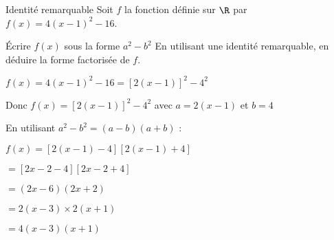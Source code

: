 \def\rdifficulty{1.5}
\begin{EXO}{Identité remarquable}{}
Soit $f$ la fonction définie sur $\R$ par $f(x)=4(x-1)^2-16$.
\begin{tcbenumerate}[2]
\tcbitem {} Écrire $f(x)$ sous la forme $a^2-b^2$
\tcbitem {} En utilisant une identité remarquable, en déduire la forme factorisée de $f$.
\end{tcbenumerate}

\exocorrection

\begin{tcbenumerate}[1]
\tcbitem $f(x) = 4(x-1)^2 - 16 = [2(x-1)]^2 - 4^2$

Donc $f(x) = [2(x-1)]^2 - 4^2$ avec $a = 2(x-1)$ et $b = 4$

\tcbitem En utilisant $a^2-b^2 = (a-b)(a+b)$ :

$f(x) = [2(x-1) - 4][2(x-1) + 4]$

$= [2x-2-4][2x-2+4]$

$= (2x-6)(2x+2)$

$= 2(x-3) \times 2(x+1)$

$= 4(x-3)(x+1)$
\end{tcbenumerate}
\end{EXO}

